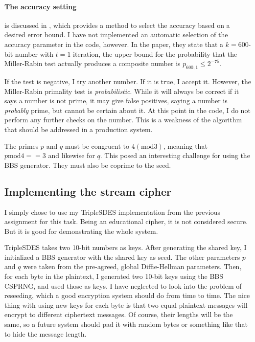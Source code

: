\documentclass[a4paper,english,12pt]{article}
\begin{document}
\paragraph{The accuracy setting} is discussed in \cite{damgaard1993average}, which
provides a method to select the accuracy based on a desired error bound. I have
not implemented an automatic selection of the accuracy parameter in the code,
however. In the paper, they state that a $k=600$-bit number with $t=1$
iteration, the upper bound for the probability that the Miller-Rabin test
actually produces a composite number is $p_{600, 1} \leqslant 2^{-75}$.

If the test is negative, I try another number. If it is true, I accept
it. However, the Miller-Rabin primality test is \textit{probabilistic}. While
it will always be correct if it says a number is not prime, it may give false
positives, saying a number is \textit{probably} prime, but cannot be certain
about it. At this point in the code, I do not perform any further checks on the
number. This is a weakness of the algorithm that should be addressed in a
production system.

The primes $p$ and $q$ must be congruent to $4 (\textrm{mod} 3)$, meaning that
$p \textrm{mod} 4 == 3$ and likewise for $q$. This posed an interesting
challenge for using the BBS generator. They must also be coprime to the seed.

\subsection{Implementing the stream cipher}
I simply chose to use my TripleSDES implementation from the previous assignment
for this task. Being an educational cipher, it is not considered secure. But it
is good for demonstrating the whole system.

TripleSDES takes two 10-bit numbers as keys. After generating the shared key, I
initialized a BBS generator with the shared key as seed. The other parameters
$p$ and $q$ were taken from the pre-agreed, global Diffie-Hellman parameters.
Then, for each byte in the plaintext, I generated two 10-bit keys using the BBS
CSPRNG, and used those as keys. I have neglected to look into the problem of
reseeding, which a good encryption system should do from time to time. The nice
thing with using new keys for each byte is that two equal plaintext messages
will encrypt to different ciphertext messages. Of course, their lengths will be
the same, so a future system should pad it with random bytes or something like
that to hide the message length.
\end{document}
